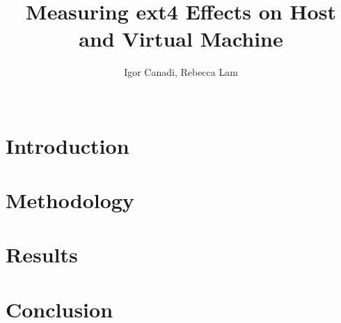 \documentclass{sig-alternate-10pt}
\begin{document}
\title{Measuring ext4 Effects on Host and Virtual Machine}

\author{
	\alignauthor Igor Canadi, Rebecca Lam\\
	\\
}

\maketitle

\lstset{
	breaklines=true
}




\section{Introduction}
\label{sec:intro}


\section{Methodology}
\label{sec:method}


\section{Results}
\label{sec:results}


\section{Conclusion}
\label{sec:conc}

\end{document}
